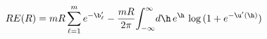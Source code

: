 \begin{equation}
R E(R) =mR \sum_{\ell=1}^{m} e^{-\b'_\ell}
-\frac{mR}{2\pi}\!\int_{-\infty}^{\infty}\!d\h\,
e^{\h}\,\log{(1+e^{-\u'(\h)})}
\end{equation}

